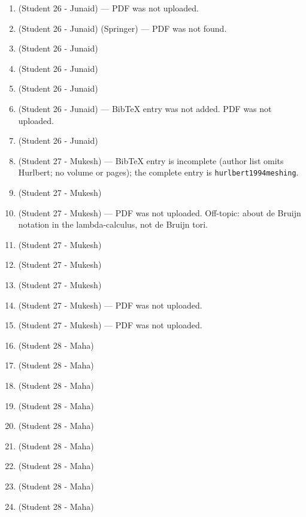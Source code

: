 \begin{enumerate}[label=\#\arabic*]
\item \cite{makarov2019construction} (Student 26 - Junaid) --- PDF was not uploaded.
\item \cite{heindl2023py} (Student 26 - Junaid) (Springer) --- PDF was not found.
\item \cite{hostettler2016real} (Student 26 - Junaid)
\item \cite{dai2012making} (Student 26 - Junaid)
\item \cite{lei2013design} (Student 26 - Junaid)
\item \cite{gabric2025constructing} (Student 26 - Junaid) --- BibTeX entry was not added. PDF was not uploaded.
\item \cite{mao2025homomorphism} (Student 26 - Junaid)
\item \cite{isaak1994meshing} (Student 27 - Mukesh) --- BibTeX entry is incomplete (author list omits Hurlbert; no volume or pages); the complete entry is \texttt{hurlbert1994meshing}.
\item \cite{chen2024robot} (Student 27 - Mukesh)
\item \cite{ohtsuka1993proof} (Student 27 - Mukesh) --- PDF was not uploaded. Off-topic: about de Bruijn notation in the lambda-calculus, not de Bruijn tori.
\item \cite{hurlbert1997higher} (Student 27 - Mukesh)
\item \cite{roig2024arithmetic} (Student 27 - Mukesh)
\item \cite{stelldinger2024puzzleboard} (Student 27 - Mukesh)
\item \cite{hsieh2002bruijn} (Student 27 - Mukesh) --- PDF was not uploaded.
\item \cite{roig2022bruijn} (Student 27 - Mukesh) --- PDF was not uploaded.
\item \cite{hurlbert1993bruijn} (Student 28 - Maha)
\item \cite{cock1988toroidal} (Student 28 - Maha)
\item \cite{kim2002existence} (Student 28 - Maha)
\item \cite{kanetkar1980construction} (Student 28 - Maha)
\item \cite{horvath2008growing} (Student 28 - Maha)
\item \cite{hurlbert1995new} (Student 28 - Maha)
\item \cite{kang2026bruijn} (Student 28 - Maha)
\item \cite{calvin1996matrix} (Student 28 - Maha)
\item \cite{stelldinger2025bruijn} (Student 28 - Maha)

\end{enumerate}
